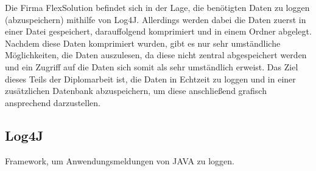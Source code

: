 Die Firma FlexSolution befindet sich in der Lage, die benötigten Daten zu loggen (abzuspeichern) mithilfe von Log4J. Allerdings werden dabei die Daten zuerst in einer Datei gespeichert, darauffolgend komprimiert und in einem Ordner abgelegt. Nachdem diese Daten komprimiert wurden, gibt es nur sehr umständliche Möglichkeiten, die Daten auszulesen, da diese nicht zentral abgespeichert werden und ein Zugriff auf die Daten sich somit als sehr umständlich erweist. Das Ziel dieses Teils der Diplomarbeit ist, die Daten in Echtzeit zu loggen und in einer zusätzlichen Datenbank abzuspeichern, um diese anschließend grafisch ansprechend darzustellen.
 
\subsection{Log4J}
Framework, um Anwendungsmeldungen von JAVA zu loggen.
